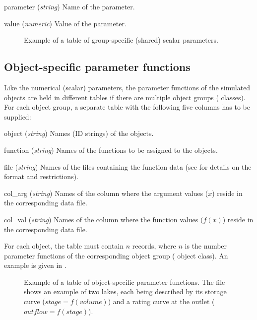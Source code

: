 \begin{columndef}
  \item [parameter] (\textit{string}) Name of the parameter.
  \item [value] (\textit{numeric}) Value of the parameter.
\end{columndef}

\begin{figure*}[htbp]
  
  \caption{Example of a table of group-specific (shared) scalar parameters. \label{fig:input-sharedParamNum}}
\end{figure*}

\subsection{Object-specific parameter functions} \label{sec:input-indivParamFun}

Like the numerical (scalar) parameters, the parameter functions of the simulated objects are held in different tables if there are multiple object groups (\ie{} classes). For each object group, a separate table with the following five columns has to be supplied:

\begin{columndef}
  \item [object] (\textit{string}) Names (ID strings) of the objects.
  \item [function] (\textit{string}) Names of the functions to be assigned to the objects.
  \item [file] (\textit{string}) Names of the files containing the function data (see  for details on the format and restrictions).
  \item [col\_arg] (\textit{string}) Names of the column where the argument values ($x$) reside in the corresponding data file.
  \item [col\_val] (\textit{string}) Names of the column where the function values ($f(x)$) reside in the corresponding data file.
\end{columndef}

For each object, the table must contain $n$ records, where $n$ is the number parameter functions of the corresponding object group (\ie{} object class). An example is given in .

\begin{figure*}[htbp]
  
  \caption[Example of a table of object-specific parameter functions.]{Example of a table of object-specific parameter functions. The file shows an example of two lakes, each being described by its storage curve ($stage = f(volume)$) and a rating curve at the outlet ($outflow = f(stage)$). \label{fig:input-indivParamFun}}
\end{figure*}

